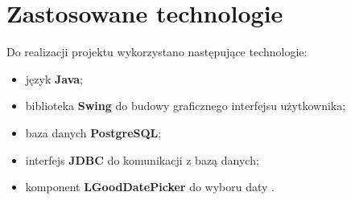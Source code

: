 \section{Zastosowane technologie}

Do realizacji projektu wykorzystano następujące technologie:

\begin{itemize}
    \item język \textbf{Java};
    \item biblioteka \textbf{Swing} do budowy graficznego interfejsu użytkownika;
    \item baza danych \textbf{PostgreSQL};
    \item interfejs \textbf{JDBC} do komunikacji z bazą danych;
    \item komponent \textbf{LGoodDatePicker} do wyboru daty \cite{lgooddatepicker}.
\end{itemize}
